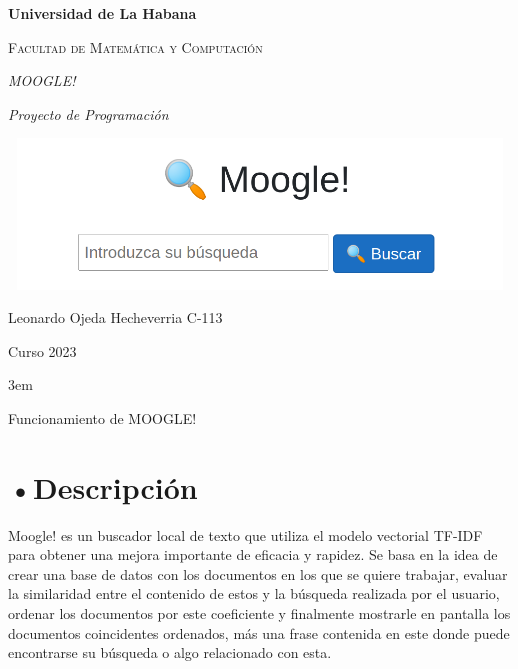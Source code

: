 \documentclass[aspectratio = 169, 14pt]{article}
\date{}
\begin{document}
\begin{titlepage}
\centering
{\bfseries\LARGE Universidad de La Habana}
\vspace{1cm}\\
{\scshape\Large Facultad de Matemática y Computación \par}
\vspace{2cm}
{\scshape\Huge\textit {MOOGLE!} \par}
\vspace{1cm}
{\itshape\Large Proyecto de Programación \par}
\vspace{4cm}
\includegraphics[width=15cm, height=4cm]{moogle.png}
\vfill
{\Large Leonardo Ojeda Hecheverria C-113 \par}
{\Large Curso 2023 \par}
\end{titlepage}
\pagestyle{headings}
\parskip 3em
\begin{center}
\end{center}
\begin{flushleft}
\begin{Huge}
Funcionamiento de MOOGLE!
\end{Huge}
\setcounter{secnumdepth}{1}
\section{•Descripción}

\end{flushleft}
\begin{Large}
Moogle! es un buscador local de texto que
utiliza el modelo vectorial TF-IDF para
obtener una mejora importante de eficacia y
rapidez. Se basa en la idea de crear una base
de datos con los documentos en los que se
quiere trabajar, evaluar la similaridad entre el
contenido de estos y la búsqueda realizada por
el usuario, ordenar los documentos por este
coeficiente y finalmente mostrarle en pantalla los
documentos coincidentes ordenados, más una
frase contenida en este donde puede
encontrarse su búsqueda o algo relacionado
con esta.

\end{Large}
\end{document}
